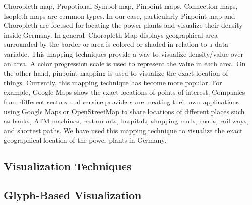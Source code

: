 Choropleth map, Propotional Symbol map, Pinpoint maps, Connection maps, Isopleth maps are common types. In our case, particularly Pinpoint map and Choropleth are focused for locating the power plants and visualize their density inside Germany. In general, Choropleth Map displays geographical area surrounded by the border or area is colored or shaded in relation to a data variable. This mapping techniques provide a way to visualize density/value over an area. A color progression scale is used to represent the value in each area. On the other hand, pinpoint mapping is used to visualize the exact location of things. Currently, this mapping technique has become more popular. For example, Google Maps show the exact locations of points of interest. Companies from different sectors and service providers are creating their own applications using Google Maps or OpenStreetMap to share locations of different places such as banks, ATM machines, restaurants, hospitals, shopping malls, roads, rail ways, and shortest paths. We have used this mapping technique to visualize the exact geographical location of the power plants in Germany.

\subsection{Visualization Techniques}

\subsection*{Glyph-Based Visualization}

